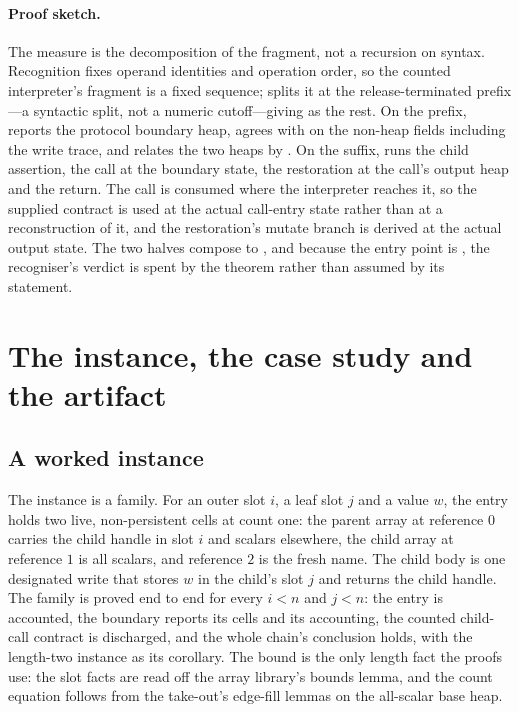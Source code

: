 \documentclass[a4paper,UKenglish,cleveref]{lipics-v2021}
\begin{document}
\paragraph*{Proof sketch.}
The measure is the decomposition of the fragment, not a recursion on syntax.
Recognition fixes operand identities and operation order, so the counted
interpreter's fragment is a fixed sequence;  splits it at
the release-terminated prefix ---a syntactic split, not a
numeric cutoff---giving  as the rest. On the prefix,
 reports the protocol boundary heap, agrees
with  on the non-heap fields including the write trace, and
relates the two heaps by . On the suffix,
 runs the child assertion, the call at the
boundary state, the restoration at the call's output heap and the return. The
call is consumed where the interpreter reaches it, so the supplied contract is
used at the actual call-entry state rather than at a reconstruction of it, and
the restoration's mutate branch is derived at the actual output state. The two
halves compose to , and because the entry point is
, the recogniser's verdict is spent by the theorem rather
than assumed by its statement.

\section{The instance, the case study and the artifact}\label{sec:case}

\subsection{A worked instance}\label{sec:case-family}
The instance is a family. For an outer slot $i$, a leaf slot $j$ and a value $w$,
the entry holds two live, non-persistent cells at count one: the parent array at
reference $0$ carries the child handle in slot $i$ and scalars elsewhere, the
child array at reference $1$ is all scalars, and reference $2$ is the fresh name.
The child body is one designated write that stores $w$ in the child's slot $j$ and
returns the child handle. The family is proved end to end for every $i < n$ and
$j < n$: the entry is accounted, the boundary reports its cells and its accounting,
the counted child-call contract is discharged, and the whole chain's conclusion
holds, with the length-two instance as its corollary. The bound is the only length
fact the proofs use: the slot facts are read off the array library's bounds lemma,
and the count equation follows from the take-out's edge-fill lemmas on the
all-scalar base heap.
\end{document}

